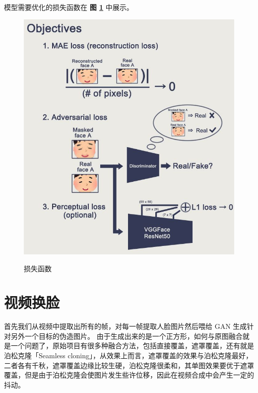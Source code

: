 模型需要优化的损失函数在 \textbf{图 \ref{fig:loss}} 中展示。


\begin{figure}[h!]
	\caption{损失函数}
	\centering
	\includegraphics[width=\textwidth]{loss.jpg}
	\label{fig:loss}
\end{figure}


\section{视频换脸}
首先我们从视频中提取出所有的帧，对每一帧提取人脸图片然后喂给 GAN 生成针对另外一个目标的伪造图片。
由于生成出来的是一个正方形，如何与原图融合就是一个问题了，原始项目有很多种融合方法，包括直接覆盖，遮罩覆盖，还有就是泊松克隆「Seamless cloning」，从效果上而言，遮罩覆盖的效果与泊松克隆最好，二者各有千秋，遮罩覆盖边缘比较生硬，泊松克隆很柔和，其单图效果要优于遮罩覆盖，但是由于泊松克隆会使图片发生些许位移，因此在视频合成中会产生一定的抖动。

